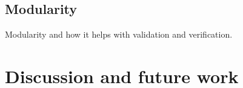 \documentclass[superscriptaddress, a4paper]{article}
\begin{document}
\subsection{Modularity}
\label{sec:modularity}

Modularity and how it helps with validation and verification.

\section{Discussion and future work}
\label{sec:discussion and future work}
\end{document}
